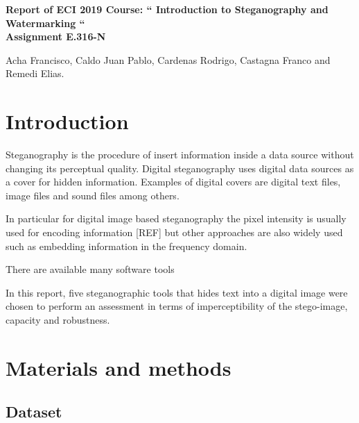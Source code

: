\documentclass[11pt]{article}
\begin{document}
\pagestyle{empty}

\begin{center}

{\Large {\bf Report of ECI 2019 Course: `` Introduction to Steganography and Watermarking ``}} \\

\bigskip
{\large \bf Assignment E.316-N}
\end{center}

\begin{center}
Acha Francisco, Caldo Juan Pablo, Cardenas Rodrigo, Castagna Franco and Remedi Elias.
\end{center}


\section{Introduction}

Steganography is the procedure of insert information inside a data source without changing its perceptual quality.
Digital steganography uses digital data sources as a cover for hidden information. Examples of digital covers
are digital text files, image files and sound files among others.  

In particular for digital image based steganography the pixel intensity is usually used for encoding information [REF]
but other approaches are also widely used such as embedding information in the frequency domain.

There are available many software tools 

In this report, five steganographic tools that hides text into a digital image were chosen to perform an assessment 
in terms of imperceptibility of the stego-image, capacity and robustness.

\section{Materials and methods}

\subsection{Dataset}
\end{document}
